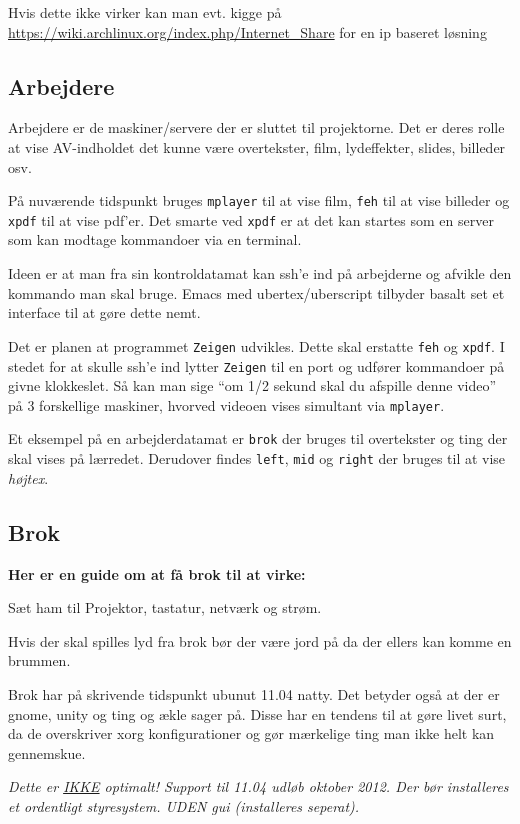 \documentclass[10pt,a4paper,danish]{article}
\begin{document}
Hvis dette ikke virker kan man evt. kigge på
\url{https://wiki.archlinux.org/index.php/Internet_Share} for en ip baseret løsning


\subsection{Arbejdere}
Arbejdere er de maskiner/servere der er sluttet til projektorne. Det er deres
rolle at vise AV-indholdet det kunne være overtekster, film, lydeffekter,
slides, billeder osv.

På nuværende tidspunkt bruges \texttt{mplayer} til at vise film, \texttt{feh}
til at vise billeder og \texttt{xpdf} til at vise pdf'er.
Det smarte ved \texttt{xpdf} er at det kan startes som en server som kan modtage
kommandoer via en terminal.

Ideen er at man fra sin kontroldatamat kan ssh'e ind på arbejderne og afvikle
den kommando man skal bruge. Emacs med ubertex/uberscript tilbyder basalt set et
interface til at gøre dette nemt.

Det er planen at programmet \texttt{Zeigen} udvikles.
Dette skal erstatte \texttt{feh} og \texttt{xpdf}.
I stedet for at skulle ssh'e ind lytter \texttt{Zeigen} til en port og udfører
kommandoer på givne klokkeslet. Så kan man sige ``om 1/2 sekund skal du afspille
denne video'' på 3 forskellige maskiner, hvorved videoen vises simultant via
\texttt{mplayer}.


Et eksempel på en arbejderdatamat er \texttt{brok} der bruges til overtekster og ting der
skal vises på lærredet.
Derudover findes \texttt{left}, \texttt{mid} og \texttt{right} der bruges til at vise \textit{højtex}.


\subsection{Brok}
\textbf{Her er en guide om at få brok til at virke:}

Sæt ham til
Projektor, tastatur, netværk og strøm.

Hvis der skal spilles lyd fra brok bør der være jord på da der ellers kan komme
en brummen.

Brok har på skrivende tidspunkt ubunut 11.04 natty.
Det betyder også at der er gnome, unity og ting og ækle sager på.
Disse har en tendens til at gøre livet surt, da de overskriver xorg
konfigurationer og gør mærkelige ting man ikke helt kan gennemskue.

\textit{Dette er \uline{IKKE} optimalt!
  Support til 11.04 udløb oktober 2012. Der bør installeres et ordentligt
  styresystem. UDEN gui (installeres seperat).}
\end{document}
